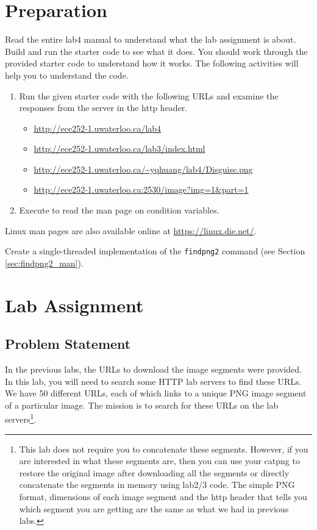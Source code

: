 \section{Preparation}
Read the entire lab4 manual to understand what the lab assignment is about. Build and run the starter code to see what it does. You should work through the provided starter code to understand how it works. The following activities will help you to understand the code.
\begin{enumerate}
\item Run the given starter code with the following URLs and examine the responses from the server in the http header. 
  \begin{itemize}
  \item \url{http://ece252-1.uwaterloo.ca/lab4}
  \item \url{http://ece252-1.uwaterloo.ca/lab3/index.html}
  \item \url{http://ece252-1.uwaterloo.ca/~yqhuang/lab4/Disguise.png}
  \item \url{http://ece252-1.uwaterloo.ca:2530/image?img=1&part=1}
  \end{itemize}
\item Execute  to read the man page on condition variables.
\end{enumerate}
Linux man pages are also available online at \url{https://linux.die.net/}.

Create a single-threaded implementation of the \verb+findpng2+ command (see Section \ref{sec:findpng2_man}).

\section{Lab Assignment}
\subsection{Problem Statement}
In the previous labs, the URLs to download the image segments were provided. In this lab, you will need to search some HTTP lab servers to find these URLs. We have 50 different URLs, each of which links to a unique PNG image segment of a particular image. The mission is to search for these URLs on the lab servers\footnote{This lab does not require you to concatenate these segments. However, if you are interested in what these segments are, then you can use your catpng to restore the original image after downloading all the segments or directly concatenate the segments in memory using lab2/3 code. The simple PNG format, dimensions of each image segment and the http header that tells you which segment you are getting are the same as what we had in previous labs.}.

